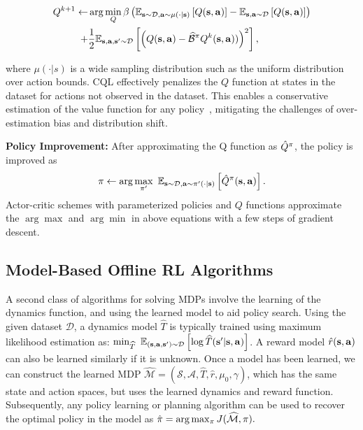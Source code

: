 \vspace*{-15pt}
\begin{small}
\begin{align}
    {Q}^{k+1} \leftarrow& \arg\min_{Q} \beta\left(\mathbb{E}_{\mathbf{s} \sim \mathcal{D}, \mathbf{a} \sim \mu(\cdot|\mathbf{s})}\left[Q(\mathbf{s},\mathbf{a})\right]- \mathbb{E}_{\mathbf{s}, \mathbf{a} \sim \mathcal{D}}\left[Q(\mathbf{s},\mathbf{a})\right]\right)\nonumber\\
    +& \frac{1}{2}\mathbb{E}_{\mathbf{s}, \mathbf{a}, \mathbf{s}' \sim \mathcal{D}}\left[ \left(Q(\mathbf{s}, \mathbf{a}) - \widehat{\mathcal{B}}^\pi {Q}^k(\mathbf{s}, \mathbf{a}))\right)^2 \right],
    \label{eq:cql_loss}
\end{align}
\end{small}
\vspace*{-15pt}

where $\mu(\cdot|s)$ is a wide sampling distribution such as the uniform distribution over action bounds. CQL effectively penalizes the $Q$ function at states in the dataset for actions not observed in the dataset. This enables a conservative estimation of the value function for any policy~\cite{kumar2020conservative}, mitigating the challenges of over-estimation bias and distribution shift.

{\bf Policy Improvement:} After approximating the Q function as $\hat{Q}^\pi$, the policy is improved as
\[
\pi \leftarrow \arg \max_{\pi'} \ \mathbb{E}_{\mathbf{s} \sim \mathcal{D}, \mathbf{a} \sim \pi'(\cdot | \mathbf{s})} \left[ \hat{Q}^\pi (\mathbf{s}, \mathbf{a}) \right].
\]
Actor-critic schemes with parameterized policies and $Q$ functions approximate the $\arg \max$ and $\arg \min$ in above equations with a few steps of gradient descent.


\subsection{Model-Based Offline RL Algorithms}
\label{sec:prelim_offline_mbrl}
A second class of algorithms for solving MDPs involve the learning of the dynamics function, and using the learned model to aid policy search. Using the given dataset $\mathcal{D}$, a dynamics model $\widehat{T}$ is typically trained using maximum likelihood estimation as:
$\min_{\widehat{T}} \ \mathbb{E}_{(\mathbf{s}, \mathbf{a}, \mathbf{s}') \sim \mathcal{D}} \left[ \log \widehat{T}(\mathbf{s}' | \mathbf{s}, \mathbf{a}) \right]$.
A reward model $\hat{r}(\mathbf{s}, \mathbf{a})$ can also be learned similarly if it is unknown. Once a model has been learned, we can construct the learned MDP $\widehat{\mathcal{M}} = (\mathcal{S}, \mathcal{A}, \widehat{T}, \hat{r}, \mu_0, \gamma)$, which has the same state and action spaces, but uses the learned dynamics and reward function. 
Subsequently, any policy learning or planning algorithm can be used to recover the optimal policy in the model as $\hat{\pi} = \arg \max_{\pi} J(\widehat{\mathcal{M}}, \pi).$

